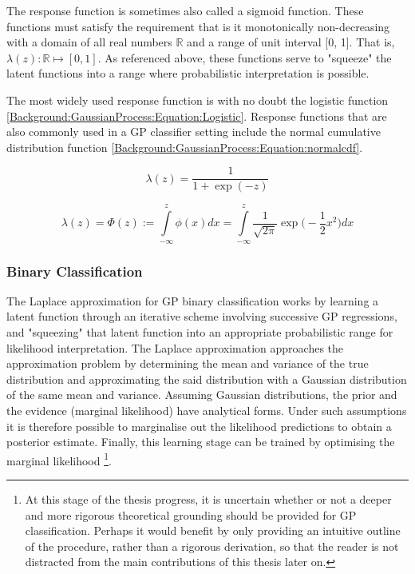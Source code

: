 				The response function is sometimes also called a sigmoid function. These functions must satisfy the requirement that is it monotonically non-decreasing with a domain of all real numbers $\mathbb{R}$ and a range of unit interval [0, 1]. That is, $\lambda(z): \mathbb{R} \mapsto [0, 1]$. As referenced above, these functions serve to "squeeze" the latent functions into a range where probabilistic interpretation is possible.
				
				The most widely used response function is with no doubt the logistic function \eqref{Background:GaussianProcess:Equation:Logistic}. Response functions that are also commonly used in a GP classifier setting include the normal cumulative distribution function \eqref{Background:GaussianProcess:Equation:normalcdf}.
				
				\begin{equation}
					\lambda(z) = \frac{1}{1 + \exp(-z)}
				\label{Background:GaussianProcess:Equation:Logistic}
				\end{equation}
				
				\begin{equation}
					\lambda(z) = \Phi(z) := \int\limits_{-\infty}^{z} \phi(x) dx =  \int\limits_{-\infty}^{z} \frac{1}{\sqrt{2 \pi}} \exp\Big(- \frac{1}{2} x^{2}\Big) dx
				\label{Background:GaussianProcess:Equation:normalcdf}
				\end{equation}
				
			\subsubsection{Binary Classification}
			
				The Laplace approximation for GP binary classification works by learning a latent function through an iterative scheme involving successive GP regressions, and "squeezing" that latent function into an appropriate probabilistic range for likelihood interpretation. The Laplace approximation approaches the approximation problem by determining the mean and variance of the true distribution and approximating the said distribution with a Gaussian distribution of the same mean and variance. Assuming Gaussian distributions, the prior and the evidence (marginal likelihood) have analytical forms. Under such assumptions it is therefore possible to marginalise out the likelihood predictions to obtain a posterior estimate. Finally, this learning stage can be trained by optimising the marginal likelihood \footnote{{\color{BurntOrange} At this stage of the thesis progress, it is uncertain whether or not a deeper and more rigorous theoretical grounding should be provided for GP classification. Perhaps it would benefit by only providing an intuitive outline of the procedure, rather than a rigorous derivation, so that the reader is not distracted from the main contributions of this thesis later on.}}.
				
